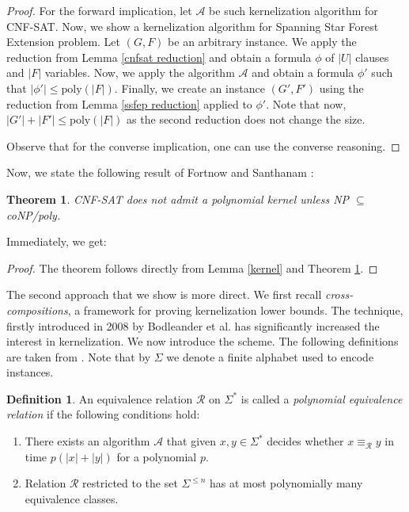 \documentclass[en]{pracamgr}
\newtheorem{theorem}{Theorem}
\theoremstyle{definition}
\newtheorem{definition}{Definition}
\newcommand{\ssfep}{{\sc Spanning Star Forest Extension}}
\newcommand{\cnfsat}{{\sc CNF-SAT}}
\begin{document}
\begin{proof}
	For the forward implication, let $\mathcal{A}$ be such kernelization algorithm for \cnfsat{}. Now, we show a kernelization algorithm for \ssfep{} problem. Let $(G,F)$ be an arbitrary instance. We apply the reduction from Lemma \ref{cnfsat reduction} and obtain a formula $\phi$ of $|U|$ clauses and $|F|$ variables. Now, we apply the algorithm $\mathcal{A}$ and obtain a formula $\phi'$ such that $|\phi'| \leq \textrm{poly}(|F|)$. Finally, we create an instance $(G',F')$ using the reduction from Lemma \ref{ssfep reduction} applied to $\phi'$. Note that now, $|G'|+|F'| \leq \textrm{poly}(|F|)$ as the second reduction does not change the size.
	
	Observe that for the converse implication, one can use the converse reasoning.
\end{proof}

Now, we state the following result of Fortnow and Santhanam \cite{CNFSAT}:

\begin{theorem}\label{Fortnow}
	\cnfsat{} does not admit a polynomial kernel unless NP $\subseteq$ coNP/poly.
\end{theorem}

Immediately, we get:

\thmssfepnokernel*

\begin{proof}
	The theorem follows directly from Lemma \ref{kernel} and Theorem \ref{Fortnow}.
\end{proof}

The second approach that we show is more direct. We first recall \textit{cross-compositions}, a framework for proving kernelization lower bounds. The technique, firstly introduced in 2008 by Bodleander et al. \cite{Bodlaender} has significantly increased the interest in kernelization. We now introduce the scheme. The following definitions are taken from \cite{ParAlg}. Note that by $\Sigma$ we denote a finite alphabet used to encode instances.

\begin{definition}\label{polynomial equivalence relation}
	An equivalence relation $\mathcal{R}$ on $\Sigma^*$ is called a \textit{polynomial equivalence relation} if the following conditions hold:
	\begin{enumerate}
		\item There exists an algorithm $\mathcal{A}$ that given $x,y \in \Sigma^*$ decides whether $x \equiv_{\mathcal{R}} y$ in time $p(|x|+|y|)$ for a polynomial $p$.
		\item Relation $\mathcal{R}$ restricted to the set $\Sigma^{\leq n}$ has at most polynomially many equivalence classes.
	\end{enumerate}
\end{definition}
\end{document}

